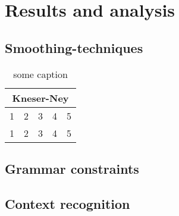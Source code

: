 \section{Results and analysis}
\lipsum[2-3]
\subsection{Smoothing-techniques}
\lipsum[1]
\vspace{1em}
\begin{table}[ht]
\centering
\begin{tabular}{ |p{}|p{}|p{}|p{}|p{}| }
	\hline
	\multicolumn{5}{|c|}{Kneser-Ney} \\
	\hline
	1 & 2 & 3 & 4 & 5 \\
	\hline
	1 & 2 & 3 & 4 & 5 \\
	\hline
\end{tabular}
\caption{some caption}
\end{table}
\vspace{1em}
\lipsum[1]
\subsection{Grammar constraints}
\lipsum[2-3]
\subsection{Context recognition}
\lipsum[2-3]